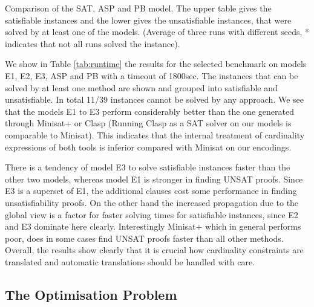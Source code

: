 \documentclass[]{llncs}
\begin{document}
\begin{table}[htbp]
    \caption{Comparison of the SAT, ASP and PB model. The upper table gives the satisfiable instances and the lower
    gives the unsatisfiable instances, that were solved by at least one of the models. (Average of three runs with
different seeds, * indicates that not all runs solved the instance).}
    \centering
    
    
    \label{tab:runtime}
\end{table}

We show in Table \ref{tab:runtime} the results for the selected benchmark on models E1, E2, E3, ASP and PB with a timeout
of 1800sec. The instances that can be solved by at least one method are shown and grouped into satisfiable and
unsatisfiable. In total 11/39 instances cannot be solved by any approach. We see that the models E1 to E3 perform
considerably better than the one generated through Minisat+ or Clasp (Running Clasp as a SAT solver on our models is
comparable to Minisat). This indicates that the internal treatment of cardinality expressions of both tools is inferior
compared with Minisat on our encodings. 

There is a tendency of model E3 to solve satisfiable instances faster than the other two models, whereas model E1 is
stronger in finding UNSAT proofs. Since E3 is a superset of E1, the additional clauses cost some performance  in finding
unsatisfiability proofs. On the other hand the increased propagation due to the global view is a factor for faster
solving times for satisfiable instances, since E2 and E3 dominate here clearly. Interestingly Minisat+ which in general
performs poor, does in some cases find UNSAT proofs faster than all other methods. Overall, the results show clearly
that it is crucial how cardinality constraints are translated and automatic translations should be handled with care. 

\subsection{The Optimisation Problem}
\end{document}
